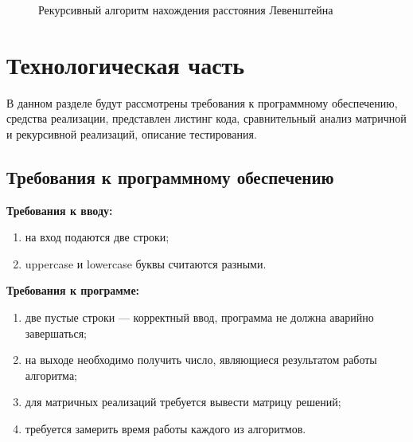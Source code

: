 \documentclass[12pt]{report}
\begin{document}
\newpage
\begin{figure}[h]
	\caption{Рекурсивный алгоритм нахождения расстояния Левенштейна}
	\label{figure:image}
\end{figure}


\chapter{Технологическая часть}
В данном разделе будут рассмотрены требования к программному обеспечению, средства реализации, представлен листинг кода, сравнительный анализ матричной и рекурсивной реализаций, описание тестирования.
\section{Требования к программному обеспечению}
\noindent\textbf{Требования к вводу:}
\begin{enumerate}
	\item на вход подаются две строки;
	\item uppercase и lowercase буквы считаются разными.
\end{enumerate}
\textbf{Требования к программе:}
\begin{enumerate}
	\item две пустые строки — корректный ввод, программа не должна аварийно завершаться;
	\item на выходе
	необходимо получить число, являющиеся результатом работы алгоритма;
	\item для матричных реализаций требуется вывести матрицу решений;
	\item требуется замерить время работы
	каждого из алгоритмов. 
\end{enumerate}
\end{document}
